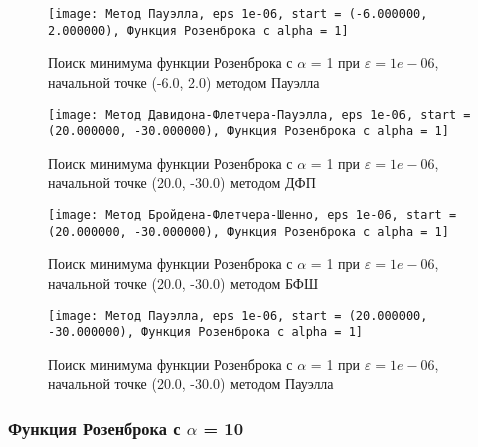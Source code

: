             \begin{figure}[H]
	        \centering
	        \texttt{[image: Метод Пауэлла, eps 1e-06, start = (-6.000000, 2.000000), Функция Розенброка с alpha = 1]}%
	        \caption{Поиск минимума функции Розенброка с $\alpha$ = 1 при $\varepsilon = 1e-06$, начальной точке (-6.0, 2.0) методом Пауэлла}
	        \vspace*{-1.2cm}
            \end{figure}
            
            \begin{figure}[H]
	        \centering
	        \texttt{[image: Метод Давидона-Флетчера-Пауэлла, eps 1e-06, start = (20.000000, -30.000000), Функция Розенброка с alpha = 1]}%
	        \caption{Поиск минимума функции Розенброка с $\alpha$ = 1 при $\varepsilon = 1e-06$, начальной точке (20.0, -30.0) методом ДФП}
	        \vspace*{-1.2cm}
            \end{figure}
            
            \begin{figure}[H]
	        \centering
	        \texttt{[image: Метод Бройдена-Флетчера-Шенно, eps 1e-06, start = (20.000000, -30.000000), Функция Розенброка с alpha = 1]}%
	        \caption{Поиск минимума функции Розенброка с $\alpha$ = 1 при $\varepsilon = 1e-06$, начальной точке (20.0, -30.0) методом БФШ}
	        \vspace*{-1.2cm}
            \end{figure}
            
            \begin{figure}[H]
	        \centering
	        \texttt{[image: Метод Пауэлла, eps 1e-06, start = (20.000000, -30.000000), Функция Розенброка с alpha = 1]}%
	        \caption{Поиск минимума функции Розенброка с $\alpha$ = 1 при $\varepsilon = 1e-06$, начальной точке (20.0, -30.0) методом Пауэлла}
	        \vspace*{-1.2cm}
            \end{figure}
            \subsubsection{Функция Розенброка с $\alpha$ = 10}

